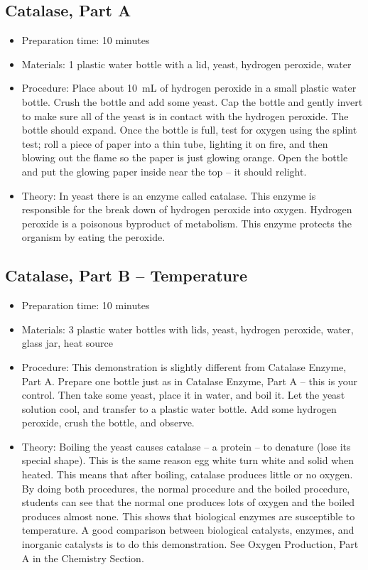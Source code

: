 \subsection{Catalase, Part A}
\begin{itemize}
\item{Preparation time: 10 minutes}
\item{Materials: 1 plastic water bottle with a lid, yeast, hydrogen peroxide, water}
\item{Procedure: Place about 10~mL of hydrogen peroxide in a small plastic water bottle. Crush the bottle and add some yeast. Cap the bottle and gently invert to make sure all of the yeast is in contact with the hydrogen peroxide. The bottle should expand. Once the bottle is full, test for oxygen using the splint test; roll a piece of paper into a thin tube, lighting it on fire, and then blowing out the flame so the paper is just glowing orange. Open the bottle and put the glowing paper inside near the top -- it should relight.}
\item{Theory: In yeast there is an enzyme called catalase. This enzyme is responsible for the break down of hydrogen peroxide into oxygen. Hydrogen peroxide is a poisonous byproduct of metabolism. This enzyme protects the organism by eating the peroxide.}
\end{itemize}

\subsection{Catalase, Part B -- Temperature}
\begin{itemize}
\item{Preparation time: 10 minutes}
\item{Materials: 3 plastic water bottles with lids, yeast, hydrogen peroxide, water, glass jar, heat source}
\item{Procedure: This demonstration is slightly different from Catalase Enzyme, Part A. Prepare one bottle just as in Catalase Enzyme, Part A -- this is your control. Then take some yeast, place it in water, and boil it. Let the yeast solution cool, and transfer to a plastic water bottle. Add some hydrogen peroxide, crush the bottle, and observe.}
\item{Theory: Boiling the yeast causes catalase -- a protein – to denature (lose its special shape). This is the same reason egg white turn white and solid when heated. This means that after boiling, catalase produces little or no oxygen. By doing both procedures, the normal procedure and the boiled procedure, students can see that the normal one produces lots of oxygen and the boiled produces almost none. This shows that biological enzymes are susceptible to temperature. A good comparison between biological catalysts, enzymes, and inorganic catalysts is to do this demonstration. See Oxygen Production, Part A in the Chemistry Section.}
\end{itemize}

